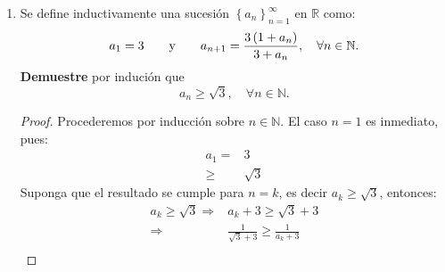 \documentclass[12pt]{article}
\begin{document}
\begin{enumerate}
\begin{proof}
        Supongamos que el resultado se cumple para $n=k$. Probaremos que se cumple para $n=k+1$. En efecto, usando la hipótesis de inducción obtenemos que:
        \begin{equation*}
            \begin{split}
                \abs{a_{k+2}-a_{k+1}}=& \abs{\lambda a_{k+1}-\lambda a_{k}}\\
                =& \abs{\lambda}\abs{a_{k+1}-a_{k}}\\
                \leq& \abs{\lambda}\cdot\abs{\lambda}^{k-1}\abs{a_2-a_1}\\
                =& \abs{\lambda}^{(k+1)-1}\abs{a_2-a_1}\\
                \Rightarrow \abs{a_{k+2}-a_{k+1}}\leq&\abs{\lambda}^{(k+1)-1}\abs{a_2-a_1}
            \end{split}
        \end{equation*}
        De esta forma, el resultado se cumple para $n=k+1$. Aplicando inducción, el resultado se cumple para toda $n\in\mathbb{N}$.
        \qed
    \end{proof}
    \item Se define inductivamente una sucesión $\left\{a_n\right\}^{\infty}_{n=1}$ en $\mathbb{R}$ como:
    \begin{equation*}
        a_1=3 \qquad \textup{y} \qquad a_{n+1}=\frac{3\left(1+a_n\right)}{3+a_n},\quad\forall n \in \mathbb{N}.
    \end{equation*}
    \textbf{Demuestre} por indución que
    \begin{equation*}
        a_n \geq \sqrt{3}, \quad \forall n\in\mathbb{N}.
    \end{equation*}
    \begin{proof}
        Procederemos por inducción sobre $n\in\mathbb{N}$. El caso $n=1$ es inmediato, pues:
        \begin{equation*}
            \begin{split}
                a_1=&3\\
                \geq&\sqrt{3}
            \end{split}
        \end{equation*}
        Suponga que el resultado se cumple para $n=k$, es decir $a_k\geq\sqrt{3}$, entonces:
        \begin{equation*}
            \begin{split}
                a_k\geq\sqrt{3}\Rightarrow&a_k+3\geq\sqrt{3}+3\\
                \Rightarrow&\frac{1}{\sqrt{3}+3}\geq\frac{1}{a_k+3}\\

\end{split}
\end{equation*}
\end{proof}
\end{enumerate}
\end{document}
